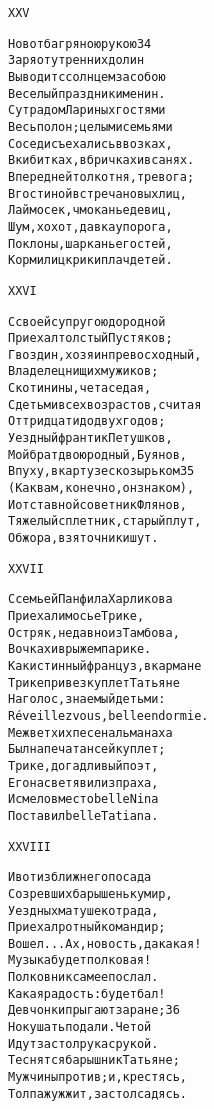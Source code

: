 \begin{minipage}[t]{\dimexpr 0.5\textwidth -\tabcolsep-.5pt}
\begin{alltt}\normalfont\centering
XXV

Но вот багряною рукою 34
Заря от утренних долин
Выводит с солнцем за собою
Веселый праздник именин.
С утра дом Лариных гостями
Весь полон; целыми семьями
Соседи съехались в возках,
В кибитках, в бричках и в санях.
В передней толкотня, тревога;
В гостиной встреча новых лиц,
Лай мосек, чмоканье девиц,
Шум, хохот, давка у порога,
Поклоны, шарканье гостей,
Кормилиц крик и плач детей.
\end{alltt}
\end{minipage}

\begin{minipage}[t]{\dimexpr 0.5\textwidth -\tabcolsep-.5pt}
\begin{alltt}\normalfont\centering
XXVI

С своей супругою дородной
Приехал толстый Пустяков;
Гвоздин, хозяин превосходный,
Владелец нищих мужиков;
Скотинины, чета седая,
С детьми всех возрастов, считая
От тридцати до двух годов;
Уездный франтик Петушков,
Мой брат двоюродный, Буянов,
В пуху, в картузе с козырьком 35
(Как вам, конечно, он знаком),
И отставной советник Флянов,
Тяжелый сплетник, старый плут,
Обжора, взяточник и шут.
\end{alltt}
\end{minipage}
\clearpage

\begin{minipage}[t]{\dimexpr 0.5\textwidth -\tabcolsep-.5pt}
\begin{alltt}\normalfont\centering
XXVII

С семьей Панфила Харликова
Приехал и мосье Трике,
Остряк, недавно из Тамбова,
В очках и в рыжем парике.
Как истинный француз, в кармане
Трике привез куплет Татьяне
На голос, знаемый детьми:
Réveillez vous, belle endormie.
Меж ветхих песен альманаха
Был напечатан сей куплет;
Трике, догадливый поэт,
Его на свет явил из праха,
И смело вместо belle Nina
Поставил belle Tatiana.
\end{alltt}
\end{minipage}

\begin{minipage}[t]{\dimexpr 0.5\textwidth -\tabcolsep-.5pt}
\begin{alltt}\normalfont\centering
XXVIII

И вот из ближнего посада
Созревших барышень кумир,
Уездных матушек отрада,
Приехал ротный командир;
Вошел... Ах, новость, да какая!
Музыка будет полковая!
Полковник сам ее послал.
Какая радость: будет бал!
Девчонки прыгают заране; 36
Но кушать подали. Четой
Идут за стол рука с рукой.
Теснятся барышни к Татьяне;
Мужчины против; и, крестясь,
Толпа жужжит, за стол садясь.
\end{alltt}
\end{minipage}
\clearpage

